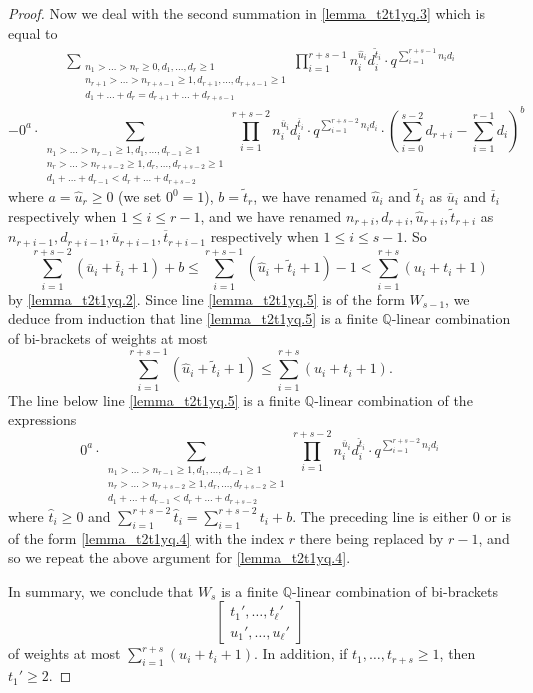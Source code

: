 \documentclass[12pt, reqno]{amsart}
\theoremstyle{definition}
\theoremstyle{remark}
\numberwithin{equation}{section}
\newcommand{\Q}{ \mathbb Q }
\newcommand{\w}{\tilde}
\numberwithin{equation}{section}
\begin{document}
\begin{proof}
Now we deal with the second summation in \eqref{lemma_t2t1yq.3} 
which is equal to
\begin{eqnarray}  \label{lemma_t2t1yq.5}
\sum_{\substack{n_1 > \ldots > n_r \ge 0, d_1, \ldots, d_r \ge 1\\
    n_{r+1} > \ldots > n_{r+s-1} \ge 1, d_{r+1}, \ldots, d_{r+s-1} \ge 1\\
    d_1+ \ldots + d_r = d_{r+1} + \ldots + d_{r+s-1}}} 
    \prod_{i=1}^{r+s-1} n_i^{\hat u_i}d_i^{\w t_i}  
    \cdot q^{\sum_{i=1}^{r+s-1} n_i d_i}
\end{eqnarray}
$$
- 0^a \cdot 
  \sum_{\substack{n_1 > \ldots > n_{r-1} \ge 1, d_1, \ldots, d_{r-1} \ge 1\\
    n_{r} > \ldots > n_{r+s-2} \ge 1, d_{r}, \ldots, d_{r+s-2} \ge 1\\
    d_1+ \ldots + d_{r-1} < d_{r} + \ldots + d_{r+s-2}}}
    \prod_{i=1}^{r+s-2} n_i^{\overline u_i} d_i^{\overline t_i}  
    \cdot q^{\sum_{i=1}^{r+s-2} n_i d_i} \cdot  
    \left (\sum_{i=0}^{s-2} d_{r+i} - \sum_{i=1}^{r-1} d_i \right )^b
$$
where $a = \hat u_r \ge 0$ (we set $0^0 =1$), $b = \w t_r$, 
we have renamed $\hat u_i$ and $\w t_i$ as 
$\overline u_i$ and $\overline t_i$ 
respectively when $1 \le i \le r-1$, and we have renamed 
$n_{r+i}, d_{r+i}, \hat u_{r+i}, \w t_{r+i}$ as $n_{r+i-1}, d_{r+i-1}, 
\overline u_{r+i-1}, \overline t_{r+i-1}$ respectively 
when $1 \le i \le s-1$. So 
$$
    \sum_{i=1}^{r+s-2} (\overline u_i + \overline t_i + 1) + b 
\le \sum_{i=1}^{r+s-1} (\hat u_i + \w t_i + 1) - 1
< \sum_{i=1}^{r+s} (u_i + t_i + 1)
$$
by \eqref{lemma_t2t1yq.2}. Since line \eqref{lemma_t2t1yq.5} is 
of the form $W_{s-1}$, we deduce from induction that 
line \eqref{lemma_t2t1yq.5} is 
a finite $\Q$-linear combination of bi-brackets of weights at most 
$$
  \sum_{i=1}^{r+s-1} (\hat u_i + \w t_i + 1)
\le \sum_{i=1}^{r+s} (u_i + t_i + 1).
$$
The line below line \eqref{lemma_t2t1yq.5} is a finite $\Q$-linear combination of the expressions 
$$
0^a \cdot 
\sum_{\substack{n_1 > \ldots > n_{r-1} \ge 1, d_1, \ldots, d_{r-1} \ge 1\\
    n_{r} > \ldots > n_{r+s-2} \ge 1, d_{r}, \ldots, d_{r+s-2} \ge 1\\
    d_1+ \ldots + d_{r-1} < d_{r} + \ldots + d_{r+s-2}}}
    \prod_{i=1}^{r+s-2} n_i^{\overline u_i} d_i^{\hat t_i}  
    \cdot q^{\sum_{i=1}^{r+s-2} n_i d_i}
$$
where $\hat t_i \ge 0$ and $\sum_{i=1}^{r+s-2} \hat t_i 
= \sum_{i=1}^{r+s-2} t_i + b$. The preceding line is either $0$ or 
is of the form \eqref{lemma_t2t1yq.4} with the index $r$ there 
being replaced by $r-1$, and so we repeat the above argument for 
\eqref{lemma_t2t1yq.4}.

In summary, we conclude that $W_s$ is a finite $\Q$-linear combination of 
bi-brackets 
$$
\begin{bmatrix} t_1', \ldots, t_\ell'\\u_1', \ldots, u_\ell' \end{bmatrix}
$$
of weights at most $\sum_{i=1}^{r+s} (u_i + t_i+1)$. In addition, 
if $t_1, \ldots, t_{r+s} \ge 1$, then $t_1' \ge 2$. 
\end{proof}
\end{document}
